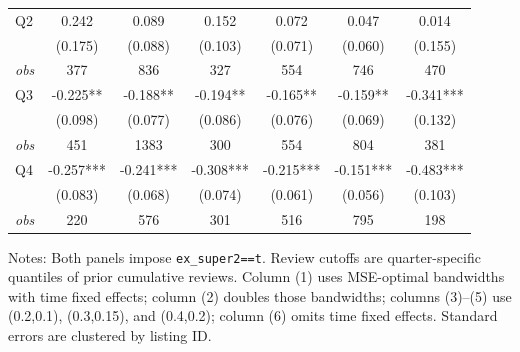 \begin{table}[!htbp]
\begin{tabular}{lcccccc}
Q2 & 0.242 & 0.089 & 0.152 & 0.072 & 0.047 & 0.014 \\
 & (0.175) & (0.088) & (0.103) & (0.071) & (0.060) & (0.155) \\
\textit{obs} & 377 & 836 & 327 & 554 & 746 & 470 \\
Q3 & -0.225** & -0.188** & -0.194** & -0.165** & -0.159** & -0.341*** \\
 & (0.098) & (0.077) & (0.086) & (0.076) & (0.069) & (0.132) \\
\textit{obs} & 451 & 1383 & 300 & 554 & 804 & 381 \\
Q4 & -0.257*** & -0.241*** & -0.308*** & -0.215*** & -0.151*** & -0.483*** \\
 & (0.083) & (0.068) & (0.074) & (0.061) & (0.056) & (0.103) \\
\textit{obs} & 220 & 576 & 301 & 516 & 795 & 198 \\
\bottomrule
\end{tabular}
\begin{minipage}{0.98\textwidth}\footnotesize
Notes: Both panels impose \texttt{ex\_super2==t}. Review cutoffs are quarter-specific quantiles of prior cumulative reviews. Column (1) uses MSE-optimal bandwidths with time fixed effects; column (2) doubles those bandwidths; columns (3)--(5) use (0.2,0.1), (0.3,0.15), and (0.4,0.2); column (6) omits time fixed effects. Standard errors are clustered by listing ID.
\end{minipage}
\end{table}


